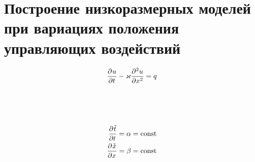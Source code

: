 \chapter{Построение низкоразмерных моделей при вариациях положения управляющих воздействий}\label{ch:ch3}


\begin{equation}
    \deriv{u}{t} - \varkappa \deriv[2]{u}{x} = q
\end{equation}

\begin{figure}[ht]
    \caption{~\cite{Elizarev2022}}\label{fig:q-deviation}
\end{figure}

\begin{figure}[ht]
    \caption{~\cite{Elizarev2022}}\label{fig:q-diff}
\end{figure}

\begin{align}
    \deriv{\check{t}}{t} = \alpha = \text{const} \\
    \deriv{\check{x}}{x} = \beta = \text{const} \\
\end{align}

